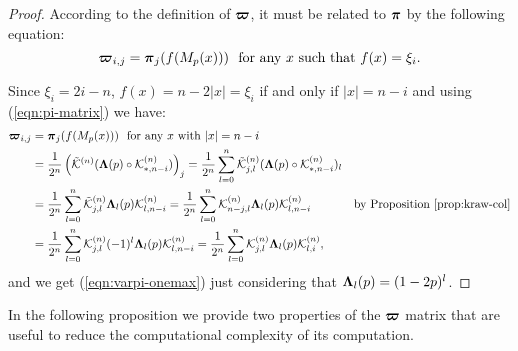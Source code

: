 \documentclass{article}
\def\vec#1{\mathchoice{\mbox{\boldmath$\displaystyle#1$}}
  {\mbox{\boldmath$\textstyle#1$}}
  {\mbox{\boldmath$\scriptstyle#1$}}
  {\mbox{\boldmath$\scriptscriptstyle#1$}}}
\newcommand{\krawel}[3]{\mathcal{K}^{#1}_{#2,#3}}
\newcommand{\krawelt}[3]{\tilde{\mathcal{K}}^{#1}_{#2,#3}}
\newcommand{\krawt}[1]{\tilde{\mathcal{K}}^{#1}}
\begin{document}
\begin{proof}
According to the definition of $\vec{\varpi}$, it must be related to $\vec{\pi}$ by the following equation:
\begin{equation}
\vec{\varpi}_{i,j} = \vec{\pi}_j (f(M_p(x))) ~~ \text{for any $x$ such that $f(x)=\xi_i$.}
\end{equation}

Since $\xi_i=2i-n$, $f(x)=n-2|x|=\xi_i$ if and only if $|x|=n-i$ and using (\ref{eqn:pi-matrix}) we have:
\begin{align}
\vec{\varpi}_{i,j} &= \vec{\pi}_j (f(M_p(x))) ~~ \text{for any $x$ with $|x|=n-i$}\nonumber  \\
&= \frac{1}{2^n} \left(\krawt{(n)} (\vec{\Lambda}(p) \circ \krawel{(n)}{*}{n-i})\right)_j 
= \frac{1}{2^n} \sum_{l=0}^{n} \krawelt{(n)}{j}{l} (\vec{\Lambda}(p) \circ \krawel{(n)}{*}{n-i})_l \nonumber \\
&= \frac{1}{2^n} \sum_{l=0}^{n} \krawelt{(n)}{j}{l} \vec{\Lambda}_l(p) \krawel{(n)}{l}{n-i} 
= \frac{1}{2^n} \sum_{l=0}^{n} \krawel{(n)}{n-j}{l} \vec{\Lambda}_l(p) \krawel{(n)}{l}{n-i} & \text{by Proposition~\ref{prop:kraw-col}} \nonumber \\
&= \frac{1}{2^n} \sum_{l=0}^{n} \krawel{(n)}{j}{l} (-1)^l\vec{\Lambda}_l(p) \krawel{(n)}{l}{n-i} 
= \frac{1}{2^n} \sum_{l=0}^{n} \krawel{(n)}{j}{l} \vec{\Lambda}_l(p) \krawel{(n)}{l}{i} ,
\end{align}
and we get (\ref{eqn:varpi-onemax}) just considering that $\vec{\Lambda}_l(p) = (1-2p)^l$.
\end{proof}

In the following proposition we provide two properties of the $\vec{\varpi}$ matrix that are useful to reduce the computational complexity of its computation.
\end{document}
